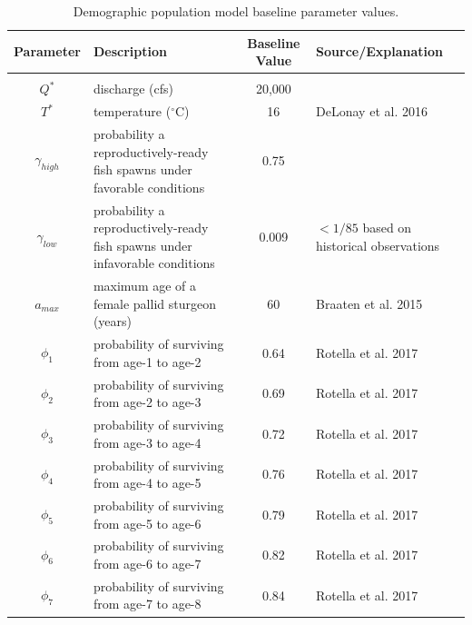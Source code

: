 \documentclass[12pt]{article}
\begin{document}
\setlength{\LTcapwidth}{0.76\textwidth}
\begin{longtable}{cp{5.5cm}cp{5cm}}
\caption{Demographic population model baseline parameter values.}\\
\hline
Parameter & \hspace{1.5cm} Description & Baseline Value &  \hspace{0.5cm} Source/Explanation\\
\hline
& & & \\
$Q^{*}$ & discharge (cfs) \newline &  20,000 & \\
$T^{*}$ & temperature ($^{\circ}$C) \newline & 16 & DeLonay et al. 2016 \\
$\gamma_{high}$ & probability a reproductively-ready fish spawns under favorable conditions \newline & 0.75 & \\
$\gamma_{low}$ & probability a reproductively-ready fish spawns under infavorable conditions \newline & 0.009 &  $<1/85$ based on historical observations\\
$a_{max}$ & maximum age of a female pallid sturgeon (years) \newline & 60 & Braaten et al. 2015\\
$\phi_1$ & probability of surviving from age-1 to age-2 \newline & 0.64 & Rotella et al. 2017\\
$\phi_2$ & probability of surviving from age-2 to age-3 \newline & 0.69 & Rotella et al. 2017\\
$\phi_3$ & probability of surviving from age-3 to age-4 \newline & 0.72 & Rotella et al. 2017\\
$\phi_4$ & probability of surviving from age-4 to age-5 \newline & 0.76 & Rotella et al. 2017\\
$\phi_5$ & probability of surviving from age-5 to age-6 \newline & 0.79 & Rotella et al. 2017\\
$\phi_6$ & probability of surviving from age-6 to age-7 \newline & 0.82 & Rotella et al. 2017\\
$\phi_7$ & probability of surviving from age-7 to age-8 \newline & 0.84 & Rotella et al. 2017\\

\end{longtable}
\end{document}
